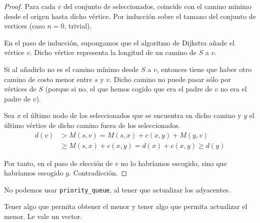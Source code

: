 \begin{proof}
    Para cada $v$ del conjunto de seleccionados, coincide con el camino minimo desde el origen hasta dicho vértice. Por inducción sobre el tamano del conjunto de vertices (caso $n=0$, trivial).

    En el paso de inducción, supongamos que el algoritmo de Dijkstra añade el vértice $v$. Dicho vértice representa la longitud de un camino de $S$ a $v$.

    Si al añadirlo no es el camino mínimo desde $S$ a $v$, entonces tiene que haber otro camino de costo menor entre $s$ y $v$. Dicho camino no puede pasar sólo por vértices de $S$ (porque si no, el que hemos cogido que era el padre de $v$ no era el padre de $v$).

    Sea $x$ el último nodo de los seleccionados que se encuentra en dicho camino y $y$ el último vértice de dicho camino fuera de los seleccionados.
    \begin{align*}
        d(v) &> M(s,v) = M(s,x) + c(x,y) + M(y, v)\\
             &\geq M(s,x) + c(x,y) = d(x) + c(x,y) \geq d(y)
    \end{align*}

    Por tanto, en el paso de elección de $v$ no lo habríamos escogido, sino que habríamos escogido $y$. Contradicción.
\end{proof}

\begin{Observacion}
    No podemos usar \verb|priority_queue|, al tener que actualizar los adyacentes.

    Tener algo que permita obtener el menor y tener algo que permita actualizar el menor.
    Le vale un vector.
\end{Observacion}


